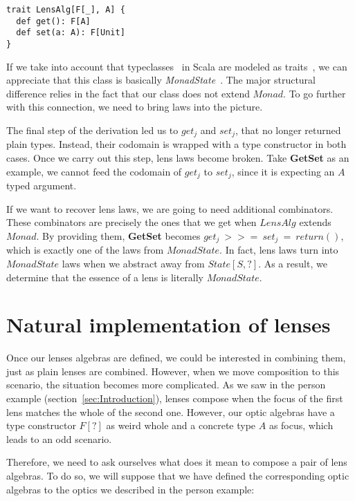\documentclass[preview, 3p]{elsarticle}
\begin{document}
\begin{lstlisting}
trait LensAlg[F[_], A] {
  def get(): F[A]
  def set(a: A): F[Unit]
}
\end{lstlisting}

If we take into account that typeclasses~\cite{wadler1989make} in Scala are
modeled as traits~\cite{oliveira2010type}, we can appreciate that this class is
basically \emph{MonadState}~\cite{gibbons2012unifying}. The major structural
difference relies in the fact that our class does not extend $Monad$. To go
further with this connection, we need to bring laws into the picture.

The final step of the derivation led us to $get_j$ and $set_j$, that no longer
returned plain types. Instead, their codomain is wrapped with a type constructor
in both cases. Once we carry out this step, lens laws become broken. Take
\textbf{GetSet} as an example, we cannot feed the codomain of $get_j$ to
$set_j$, since it is expecting an $A$ typed argument.

If we want to recover lens laws, we are going to need additional combinators.
These combinators are precisely the ones that we get when $LensAlg$ extends
$Monad$. By providing them, \textbf{GetSet} becomes $get_j\ >>=\ set_j\ =\
return()$, which is exactly one of the laws from $MonadState$. In fact, lens
laws turn into $MonadState$ laws when we abstract away from $State[S, ?]$. As a
result, we determine that the essence of a lens is literally $MonadState$.

\section{Natural implementation of lenses}
\label{sec:Natural}

Once our lenses algebras are defined, we could be interested in combining them,
just as plain lenses are combined. However, when we move composition to this
scenario, the situation becomes more complicated. As we saw in the person
example (section~\ref{sec:Introduction}), lenses compose when the focus of the
first lens matches the whole of the second one. However, our optic algebras have
a type constructor $F[?]$ as weird whole and a concrete type $A$ as focus, which
leads to an odd scenario.

Therefore, we need to ask ourselves what does it mean to compose a pair of lens
algebras. To do so, we will suppose that we have defined the corresponding optic
algebras to the optics we described in the person example:
\end{document}
